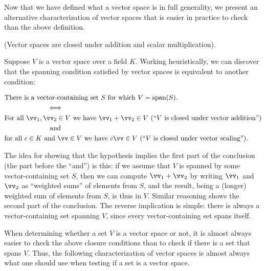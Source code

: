 Now that we have defined what a vector space is in full generality, we present an alternative characterization of vector spaces that is easier in practice to check than the above definition. 

\begin{deriv}
    (Vector spaces are closed under addition and scalar multiplication).
    
    Suppose $V$ is a vector space over a field $K$. Working heuristically, we can discover that the spanning condition satisfied by vector spaces is equivalent to another condition:
    
    \begin{align*}
        &\text{There is a vector-containing set $S$ for which $V = \spann(S)$.} \\
        &\quad \quad \quad \quad \quad \quad \iff \\
        &\text{For all $\vv_1, \vv_2 \in V$ we have $\vv_1 + \vv_2 \in V$ (``$V$ is closed under vector addition'')} \\
        &\quad \quad \quad \quad \quad \quad \spc \spc \text{and} \\
        &\text{for all $c \in K$ and $\vv \in V$ we have $c \vv \in V$ (``$V$ is closed under vector scaling'')}.
    \end{align*}
    
    The idea for showing that the hypothesis implies the first part of the conclusion (the part before the ``and'') is this: if we assume that $V$ is spanned by some vector-containing set $S$, then we can compute $\vv_1 + \vv_2$ by writing $\vv_1$ and $\vv_2$ as ``weighted sums'' of elements from $S$, and the result, being a (longer) weighted sum of elements from $S$, is thus in $V$. Similar reasoning shows the second part of the conclusion. The reverse implication is simple: there is always a vector-containing set spanning $V$, since every vector-containing set spans itself.
\end{deriv}

When determining whether a set $V$ is a vector space or not, it is almost always easier to check the above closure conditions than to check if there is a set that spans $V$. Thus, the following characterization of vector spaces is almost always what one should use when testing if a set is a vector space.

